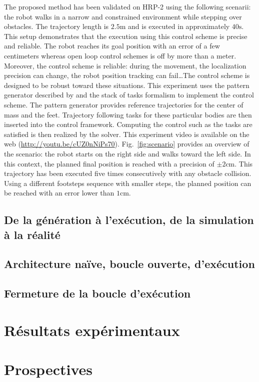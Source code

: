 The proposed method has been validated on HRP-2 using the following
scenarii: the robot walks in a narrow and constrained environment
while stepping over obstacles. The trajectory length is
$2.5\mathrm{m}$ and is executed in approximately $40\mathrm{s}$.
%
%
This setup demonstrates that the execution using this control scheme
is precise and reliable. The robot reaches its goal position with an
error of a few centimeters whereas open loop control schemes is off by
more than a meter. Moreover, the control scheme is reliable: during
the movement, the localization precision can change, the robot
position tracking can fail\ldots The control scheme is designed to be
robust toward these situations.
%
%
This experiment uses the pattern generator described by
\cite{10icra.perrin} and the stack of tasks formalism
\cite{09icar.mansard} to implement the control scheme. The pattern
generator provides reference trajectories for the center of mass and
the feet. Trajectory following tasks for these particular bodies are
then inserted into the control framework. Computing the control such
as the tasks are satisfied is then realized by the solver.
%
%
This experiment video is available on the
web (\mbox{\url{http://youtu.be/cUZ0nNiPs70}}). Fig.~\ref{fig:scenario}
provides an overview of the scenario: the robot starts on the right
side and walks toward the left side.
%
%
In this context, the planned final position is
reached with a precision of $\pm 2 \mathrm{cm}$. This trajectory has
been executed five times consecutively with any obstacle collision.
Using a different footsteps sequence with smaller steps, the planned
position can be reached with an error lower than $1 \mathrm{cm}$.


\subsection{De la génération à l'exécution, de la simulation à la réalité}
\subsection{Architecture naïve, boucle ouverte, d'exécution}
\subsection{Fermeture de la boucle d'exécution}

\section{Résultats expérimentaux}

\section{Prospectives}
